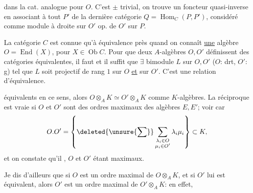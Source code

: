 dans la cat. analogue pour $O$. C'est $\pm$ trivial, on trouve un foncteur quasi-inverse en associant à tout $P'$ de la dernière catégorie $Q=\operatorname{Hom}_C(P,P')$, considéré comme module à droite sur $O'$  op.  de $O'$ sur $P$.

La catégorie $C$ est connue qu'à équivalence  près  quand on connaît \uline{une} algèbre $O=\operatorname{End}(X)$, pour $X\in\operatorname{Ob}C$.
Pour que deux $A$-algèbres $O,O'$ définissent  des catégories  équivalentes, il faut et il suffit que $\exists$ bimodule $L$ sur $O,O'$ ($O$: drt, $O'$: g) tel que $L$ soit projectif de rang $1$ sur $O$ \uline{et} sur $O'$. C'est une relation d'équivalence.

 équivalents en ce sens, alors $O\otimes_A K\simeq O'\otimes_A K$ comme  $K$-algèbres. La réciproque est vraie si $O$ et $O'$ sont  des ordres maximaux des  algèbres   $E,E'$; 
voir car
\[
O.O'=\left\{\deleted{\unsure{\sum}}\sum_{\substack{\lambda_i\in O\\\mu_i\in O'}}\lambda_i\mu_i\right\}\subset K,
\]
et on constate qu'il , $O$ et $O'$ étant maximaux.

 Je dis d'ailleurs que si $O$ est un ordre maximal de $O\otimes_A K$, et si $O'$ lui est équivalent, alors $O'$ est un ordre maximal de $O'\otimes_A K$: en effet,
